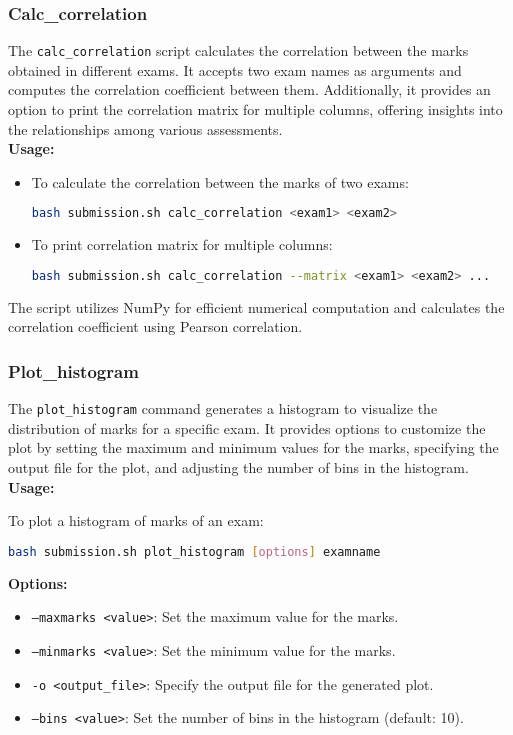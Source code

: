 \documentclass{article}
\begin{document}
\subsubsection{Calc\_correlation}
The \texttt{calc\_correlation} script calculates the correlation between the marks obtained in different exams. It accepts two exam names as arguments and computes the correlation coefficient between them. Additionally, it provides an option to print the correlation matrix for multiple columns, offering insights into the relationships among various assessments.\\
\textbf{Usage:}
\begin{itemize}
    \item To calculate the correlation between the marks of two exams:
    \begin{lstlisting}[language=bash]
    bash submission.sh calc_correlation <exam1> <exam2>
    \end{lstlisting}
    \item To print correlation matrix for multiple columns:
    \begin{lstlisting}[language=bash]
    bash submission.sh calc_correlation --matrix <exam1> <exam2> ...
    \end{lstlisting}
\end{itemize}

The script utilizes NumPy for efficient numerical computation and calculates the correlation coefficient using Pearson correlation.

\subsubsection{Plot\_histogram}
The \texttt{plot\_histogram} command generates a histogram to visualize the distribution of marks for a specific exam. It provides options to customize the plot by setting the maximum and minimum values for the marks, specifying the output file for the plot, and adjusting the number of bins in the histogram.\\
\textbf{Usage:}
\begin{adjustwidth}{0.5cm}{0cm}
To plot a histogram of marks of an exam:
\begin{lstlisting}[language=bash]
bash submission.sh plot_histogram [options] examname
\end{lstlisting}
\end{adjustwidth}

\textbf{Options:}
\begin{itemize}
    \item \texttt{--maxmarks <value>}: Set the maximum value for the marks.
    \item \texttt{--minmarks <value>}: Set the minimum value for the marks.
    \item \texttt{-o <output\_file>}: Specify the output file for the generated plot.
    \item \texttt{--bins <value>}: Set the number of bins in the histogram (default: 10).
\end{itemize}
\end{document}
